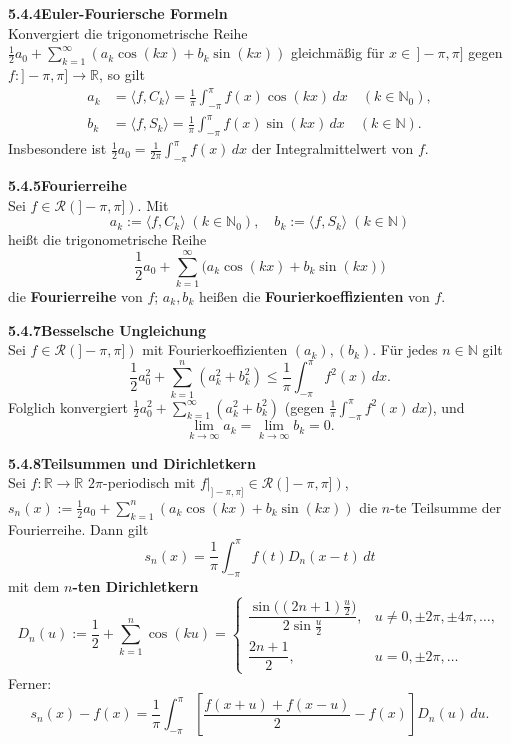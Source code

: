 \documentclass[a4paper,12pt]{article}
\newcommand{\gentry}[3]{%
  \noindent\textbf{#1\quad #2}\nopagebreak\\[0.2em]
  #3\par\smallskip
}
\begin{document}
\gentry{5.4.4}{Euler-Fouriersche Formeln}{%
  Konvergiert die trigonometrische Reihe $\frac{1}{2}a_0 + \sum_{k=1}^\infty (a_k \cos(kx) + b_k \sin(kx))$
  gleichmäßig für $x \in\,]-\pi,\pi]$ gegen $f: ]-\pi,\pi] \to \mathbb{R}$, so gilt
  \begin{align*}
    a_k &= \langle f, C_k \rangle = \frac{1}{\pi} \int_{-\pi}^\pi f(x) \cos(kx)\,dx \quad (k \in \mathbb{N}_0),\\
    b_k &= \langle f, S_k \rangle = \frac{1}{\pi} \int_{-\pi}^\pi f(x) \sin(kx)\,dx \quad (k \in \mathbb{N}).
  \end{align*}
  Insbesondere ist $\frac{1}{2} a_0 = \frac{1}{2\pi}\int_{-\pi}^\pi f(x)\,dx$ der
  Integralmittelwert von $f$.
}

\gentry{5.4.5}{Fourierreihe}{%
  Sei $f \in \mathcal{R}(]-\pi,\pi])$. Mit
  \[
    a_k := \langle f, C_k \rangle \; (k \in \mathbb{N}_0), \quad
    b_k := \langle f, S_k \rangle \; (k \in \mathbb{N})
  \]
  heißt die trigonometrische Reihe
  \[
    \frac{1}{2} a_0 + \sum_{k=1}^\infty \bigl(a_k \cos(kx) + b_k \sin(kx)\bigr)
  \]
  die \textbf{Fourierreihe} von $f$; $a_k, b_k$ heißen die
  \textbf{Fourierkoeffizienten} von $f$.
}

\gentry{5.4.7}{Besselsche Ungleichung}{%
  Sei $f \in \mathcal{R}(]-\pi,\pi])$ mit Fourierkoeffizienten $(a_k), (b_k)$.
  Für jedes $n \in \mathbb{N}$ gilt
  \[
    \frac{1}{2} a_0^2 + \sum_{k=1}^n (a_k^2 + b_k^2)
    \leq \frac{1}{\pi} \int_{-\pi}^\pi f^2(x)\,dx.
  \]
  Folglich konvergiert $\frac{1}{2} a_0^2 + \sum_{k=1}^\infty (a_k^2 + b_k^2)$
  (gegen $\frac{1}{\pi}\int_{-\pi}^\pi f^2(x)\,dx$), und
  \[
    \lim_{k\to\infty} a_k = \lim_{k\to\infty} b_k = 0.
  \]
}

\gentry{5.4.8}{Teilsummen und Dirichletkern}{%
  Sei $f: \mathbb{R} \to \mathbb{R}$ $2\pi$-periodisch mit
  $f|_{]-\pi,\pi]} \in \mathcal{R}(]-\pi,\pi])$,
  $s_n(x) := \frac{1}{2} a_0 + \sum_{k=1}^n (a_k \cos(kx) + b_k \sin(kx))$ die
  $n$-te Teilsumme der Fourierreihe. Dann gilt
  \[
    s_n(x) = \frac{1}{\pi} \int_{-\pi}^\pi f(t) D_n(x - t)\,dt
  \]
  mit dem \textbf{$n$-ten Dirichletkern}
  \[
    D_n(u) := \frac{1}{2} + \sum_{k=1}^n \cos(ku) =
    \begin{cases}
      \dfrac{\sin\bigl((2n+1)\frac{u}{2}\bigr)}{2 \sin\frac{u}{2}}, & u \neq 0, \pm 2\pi, \pm 4\pi, \ldots,\\[0.5em]
      \dfrac{2n+1}{2}, & u = 0, \pm 2\pi, \ldots
    \end{cases}
  \]
  Ferner:
  \[
    s_n(x) - f(x) = \frac{1}{\pi} \int_{-\pi}^\pi \left[\frac{f(x+u) + f(x-u)}{2} - f(x)\right] D_n(u)\,du.
  \]
}
\end{document}
